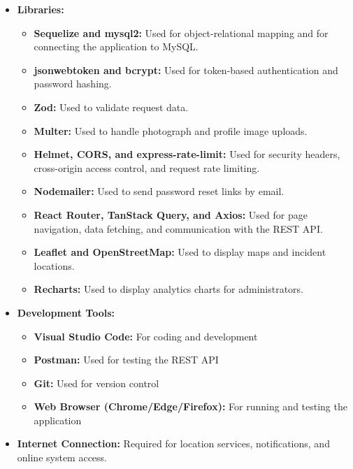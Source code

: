 \documentclass[a4paper,12pt]{report}
\begin{document}
\begin{itemize}
		\item \textbf{Libraries:}
		\begin{itemize}
			\item \textbf{Sequelize and mysql2:} Used for object-relational mapping and for connecting the application to MySQL.
			\item \textbf{jsonwebtoken and bcrypt:} Used for token-based authentication and password hashing.
			\item \textbf{Zod:} Used to validate request data.
			\item \textbf{Multer:} Used to handle photograph and profile image uploads.
			\item \textbf{Helmet, CORS, and express-rate-limit:} Used for security headers, cross-origin access control, and request rate limiting.
			\item \textbf{Nodemailer:} Used to send password reset links by email.
			\item \textbf{React Router, TanStack Query, and Axios:} Used for page navigation, data fetching, and communication with the REST API.
			\item \textbf{Leaflet and OpenStreetMap:} Used to display maps and incident locations.
			\item \textbf{Recharts:} Used to display analytics charts for administrators.
		\end{itemize}
		
		\item \textbf{Development Tools:}
		\begin{itemize}
			\item \textbf{Visual Studio Code:} For coding and development
			\item \textbf{Postman:} Used for testing the REST API
			\item \textbf{Git:} Used for version control
			\item \textbf{Web Browser (Chrome/Edge/Firefox):} For running and testing the application
		\end{itemize}
		
		\item \textbf{Internet Connection:} Required for location services, notifications, and online system access.
		
	\end{itemize}
	
\end{document}
